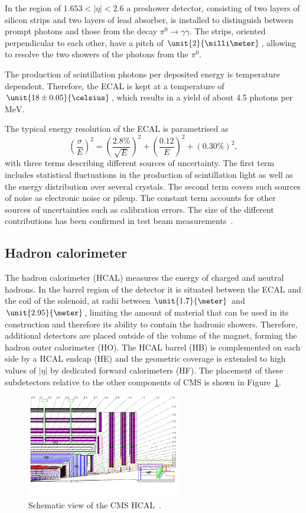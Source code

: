 In the region of $1.653 < \vert \eta \vert < 2.6$ a preshower detector, consisting of two layers of silicon strips and two layers of lead absorber, is installed to distinguish between prompt photons and those from the decay $\pi^0 \rightarrow \gamma\gamma$. The strips, oriented perpendicular to each other, have a pitch of $\unit{2}{\milli\meter}$, allowing to resolve the two showers of the photons from the $\pi^0$. 

The production of scintillation photons per deposited energy is temperature dependent. Therefore, the ECAL is kept at a temperature of $\unit{18\pm0.05}{\celsius}$, which results in a yield of about 4.5 photons per $\mathrm{MeV}$. 

The typical energy resolution of the ECAL is parametrised as
\begin{equation}
\left(\frac{\sigma}{E}\right)^2 = \left( \frac{2.8\%}{\sqrt{E}}\right)^2 + \left( \frac{0.12}{E} \right)^2 + (0.30\%)^2,
\end{equation}
with three terms describing different sources of uncertainty. The first term includes statistical fluctuations in the production of scintillation light as well as the energy distribution over several crystals. The second term covers such sources of noise as electronic noise or pileup. The constant term accounts for other sources of uncertainties such as calibration errors. The size of the different contributions has been confirmed in test beam measurements~\cite{EGM-10-003}. 
\subsection{Hadron calorimeter}
The hadron calorimeter (HCAL) measures the energy of charged and neutral hadrons. In the barrel region of the detector it is situated between the ECAL and the coil of the solenoid, at radii between $\unit{1.7}{\meter}$ and $\unit{2.95}{\meter}$, limiting the amount of material that can be used in its construction and therefore its ability to contain the hadronic showers. Therefore, additional detectors are placed outside of the volume of the magnet, forming the hadron outer calorimeter (HO). The HCAL barrel (HB) is complemented on each side by a HCAL endcap (HE) and the geometric coverage is extended to high values of $\vert \eta \vert$ by dedicated forward calorimeters (HF). The placement of these subdetectors relative to the other components of CMS is shown in Figure~\ref{fig:HCAL}.
\begin{figure}[htbp]
\centering
  \includegraphics[width=0.6\textwidth]{plots/CMS/HCAL.png}
\caption{Schematic view of the CMS HCAL~\cite{CMS}.}
\label{fig:HCAL}
\end{figure} 
